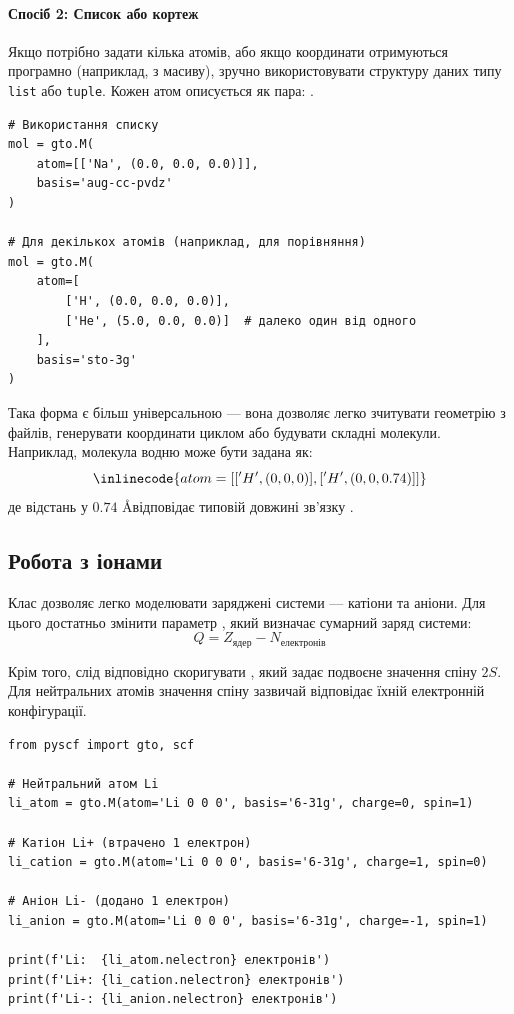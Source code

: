 \paragraph{Спосіб 2: Список або кортеж}

Якщо потрібно задати кілька атомів, або якщо координати отримуються програмно (наприклад, з масиву),
зручно використовувати структуру даних типу \texttt{list} або \texttt{tuple}.
Кожен атом описується як пара: \inlinecode{[ім'я, (x, y, z)]}.

\begin{verbatim}
# Використання списку
mol = gto.M(
    atom=[['Na', (0.0, 0.0, 0.0)]],
    basis='aug-cc-pvdz'
)

# Для декількох атомів (наприклад, для порівняння)
mol = gto.M(
    atom=[
        ['H', (0.0, 0.0, 0.0)],
        ['He', (5.0, 0.0, 0.0)]  # далеко один від одного
    ],
    basis='sto-3g'
)
\end{verbatim}

Така форма є більш універсальною --- вона дозволяє легко зчитувати геометрію з файлів,
генерувати координати циклом або будувати складні молекули.
Наприклад, молекула водню  може бути задана як:
\[
	\inlinecode{atom = [['H', (0, 0, 0)], ['H', (0, 0, 0.74)]]}
\]
де відстань у $0.74$ \AA відповідає типовій довжині зв’язку .

\subsection{Робота з іонами}

Клас  дозволяє легко моделювати заряджені системи --- катіони та аніони.
Для цього достатньо змінити параметр , який визначає сумарний заряд системи:
\[
	Q = Z_\text{ядер} - N_\text{електронів}
\]

Крім того, слід відповідно скоригувати , який задає подвоєне значення спіну $2S$.
Для нейтральних атомів значення спіну зазвичай відповідає їхній електронній конфігурації.

\begin{verbatim}
from pyscf import gto, scf

# Нейтральний атом Li
li_atom = gto.M(atom='Li 0 0 0', basis='6-31g', charge=0, spin=1)

# Катіон Li+ (втрачено 1 електрон)
li_cation = gto.M(atom='Li 0 0 0', basis='6-31g', charge=1, spin=0)

# Аніон Li- (додано 1 електрон)
li_anion = gto.M(atom='Li 0 0 0', basis='6-31g', charge=-1, spin=1)

print(f'Li:  {li_atom.nelectron} електронів')
print(f'Li+: {li_cation.nelectron} електронів')
print(f'Li-: {li_anion.nelectron} електронів')
\end{verbatim}

